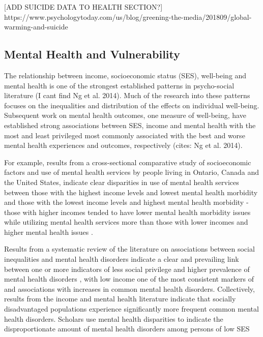 \documentclass{article}
\begin{document}
[ADD SUICIDE DATA TO HEALTH SECTION?]
https://www.psychologytoday.com/us/blog/greening-the-media/201809/global-warming-and-suicide

\subsection{Mental Health and Vulnerability}



The relationship between income, socioeconomic status (SES), well-being and mental health is one of the strongest established patterns in psycho-social literature \citep{Easterlin1974Jan, holzer1986increased, Perry1996Sep} (I cant find Ng et al. 2014). Much of the research into these patterns focuses on the inequalities and distribution of the effects on individual well-being. Subsequent work on mental health outcomes, one measure of well-being, have established strong associations between SES, income and mental health with the most and least privileged most commonly associated with the best and worse mental health experiences and outcomes, respectively \citep{Sevenson2008Aug}(cites: Ng et al. 2014). 

For example, results from a cross-sectional comparative study of socioeconomic factors and use of mental health services by people living in Ontario, Canada and the United States, indicate clear disparities in use of mental health services between those with the highest income levels and lowest mental health morbidity and those with the lowest income levels and highest mental health morbidity - those with higher incomes tended to have lower mental health morbidity issues while utilizing mental health services more than those with lower incomes and higher mental health issues \citep{Katz1997}. 

Results from a systematic review of the literature on associations between social inequalities and mental health disorders indicate a clear and prevailing link between  one or more indicators of less social privilege and higher prevalence of mental health disorders \citep{Fryers2003}, with low income one of the most consistent markers of and associations with increases in common mental health disorders. Collectively, results from the income and mental health literature indicate that socially disadvantaged populations experience significantly more frequent common mental health disorders. Scholars use mental health disparities to indicate the disproportionate amount of mental health disorders among persons of low SES \citep{RN1292}
\end{document}
